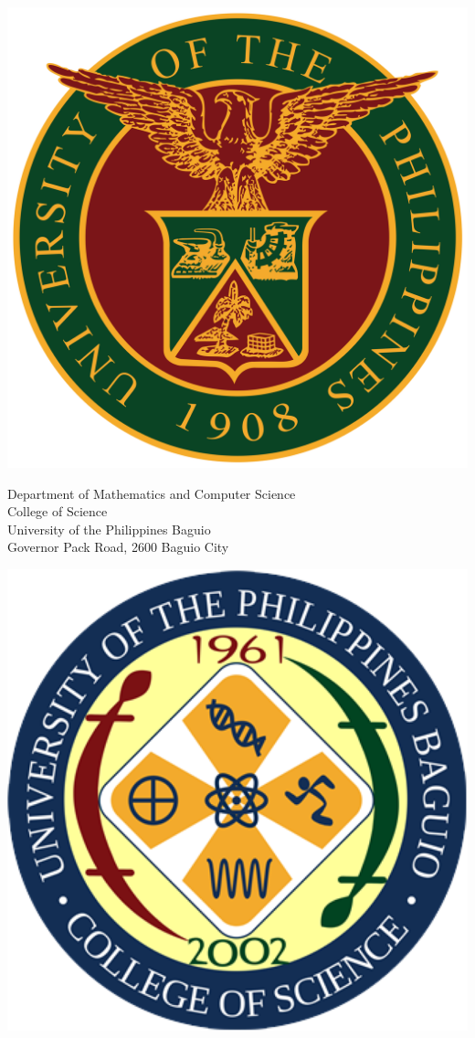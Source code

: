 \documentclass[a4paper, 12pt]{report}
\begin{document}
	\vspace*{\fill}
	\centering
	\begin{minipage}{0.2\textwidth}\flushright
		\includegraphics[height=2.5 cm, width=2.5 cm]{updlogo.png}
	\end{minipage}%
 	\begin{minipage}{0.6 \textwidth}	\centering
	Department of Mathematics and Computer Science\\
	College of Science\\
    University of the Philippines Baguio\\
    Governor Pack Road, 2600 Baguio City
	\end{minipage}%
	\begin{minipage}{0.2\textwidth}
	\includegraphics[height=2.5 cm, width=2.5 cm]{cslogo.png}
	\end{minipage}
    \bigskip 
	\vspace{0.75 cm}
    
\end{document}
